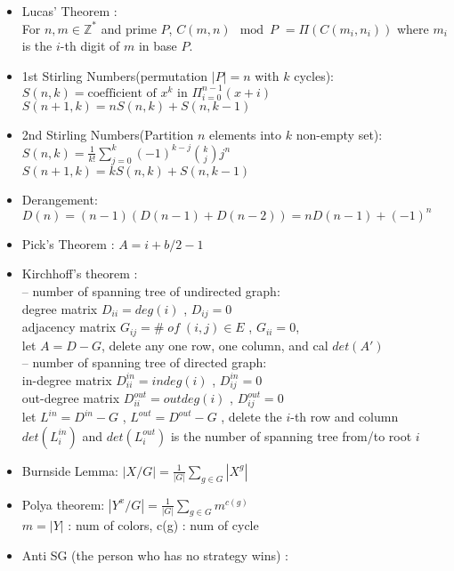 \begin{itemize}
\item Lucas’ Theorem :\\
  For $n, m \in \mathbb{Z}^{*}$ and prime $P$,
  $C(m,n) \mod P$
	$= \Pi ( C(m_i,n_i) )$
	where $m_i$ is the $i$-th digit of $m$ in base $P$.
\item 1st Stirling Numbers(permutation $|P|=n$ with $k$ cycles): \\
  $S(n,k) = \text{coefficient of }x^k \text{ in } \Pi_{i=0}^{n-1} (x+i)$ \\
  $S(n+1,k) = nS(n,k)+S(n,k-1)$
\item 2nd Stirling Numbers(Partition $n$ elements into $k$ non-empty set): \\
  $S(n,k) = \frac{1}{k!} \sum\limits_{j=0}^k (-1)^{k-j} {k \choose j} j^n$ \\
  $S(n+1,k) = kS(n,k)+S(n,k-1)$
\item Derangement: \\
  $D(n)=(n-1)(D(n-1)+D(n-2))=nD(n-1)+(-1)^n$
\item Pick’s Theorem : $A = i + b/2 - 1$
\item Kirchhoff's theorem :\\
  -- number of spanning tree of undirected graph:\\
  degree matrix $D_{ii} = deg(i)$ , $D_{ij} = 0$\\
  adjacency matrix $G_{ij} = \#\;of\;(i,j) \in E$ , $G_{ii} = 0$,\\
  let $A = D - G$, delete any one row, one column, and cal $det(A')$\\
  -- number of spanning tree of directed graph:\\
  in-degree matrix $D_{ii}^{in} = indeg(i)$ , $D_{ij}^{in} = 0$\\
  out-degree matrix $D_{ii}^{out} = outdeg(i)$ , $D_{ij}^{out} = 0$\\
  let $L^{in} = D^{in} - G$ , $L^{out} = D^{out} - G$ , delete the $i$-th row and column\\
  $det(L_i^{in})$ and $det(L_i^{out})$ is the number of spanning tree from/to root $i$\\
\item Burnside Lemma:
  $|X/G|=\frac{1}{|G|}\sum\limits_{g \in G} {|X^g|}$
\item Polya theorem:
  $|Y^x/G|=\frac{1}{|G|}\sum\limits_{g \in G} {m^{c(g)}}$\\
  $m = |Y|$ : num of colors, c(g) : num of cycle
\item Anti SG (the person who has no strategy wins) :\\

\end{itemize}
